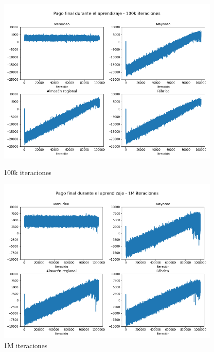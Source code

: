 \begin{figure}[!htb]
   \begin{minipage}{0.48\textwidth}
     \centering
     \includegraphics[width=1\linewidth]{tesis_tex/figs/policyiteration_payouts_100000.png}
     \caption{100k iteraciones}\label{politer_payouts_100000}
   \end{minipage}\hfill
   \begin{minipage}{0.48\textwidth}
     \centering
     \includegraphics[width=1\linewidth]{tesis_tex/figs/policyiteration_payouts_1000000.png}
     \caption{1M iteraciones}\label{politer_payouts_1000000}
   \end{minipage}
\end{figure}

